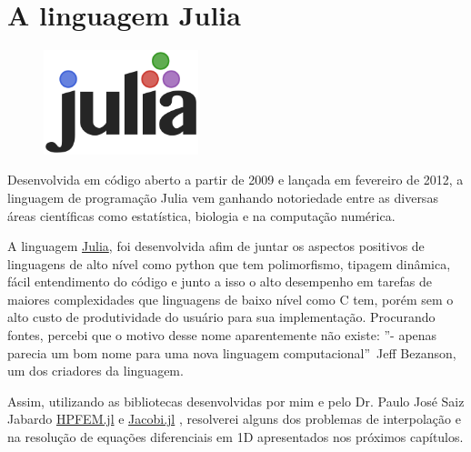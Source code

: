  
\section{A linguagem Julia}
\begin{figure}[H]
\centering
\includegraphics[width=0.4\textwidth,left]{figuras/julia.png}
\end{figure}
Desenvolvida em código aberto a partir de 2009 e lançada em fevereiro de 2012, a linguagem de programação Julia vem ganhando notoriedade entre as diversas áreas científicas como estatística, biologia e na computação numérica.

A linguagem \href{http://julialang.org/}{Julia}, foi desenvolvida afim de juntar os aspectos positivos de linguagens de alto nível como python que tem polimorfismo, tipagem dinâmica, fácil entendimento do código e junto a isso o alto desempenho em tarefas de maiores complexidades que linguagens de baixo nível como C tem, porém sem o  alto custo de produtividade do usuário para sua implementação. Procurando fontes, percebi que o motivo desse nome aparentemente não existe: ''- apenas parecia um bom nome para uma nova linguagem computacional''\  Jeff Bezanson, um dos criadores da linguagem.

Assim, utilizando as bibliotecas desenvolvidas por mim e pelo  Dr. Paulo José Saiz Jabardo \href{www.github.com/pjabardo/HPFEM.jl}{HPFEM.jl} e \href{www.github.com/pjabardo/Jacobi.jl}{Jacobi.jl} , resolverei alguns dos problemas de interpolação e na resolução de equações diferenciais em 1D apresentados nos próximos capítulos.
 
\pagebreak

%
%
%




